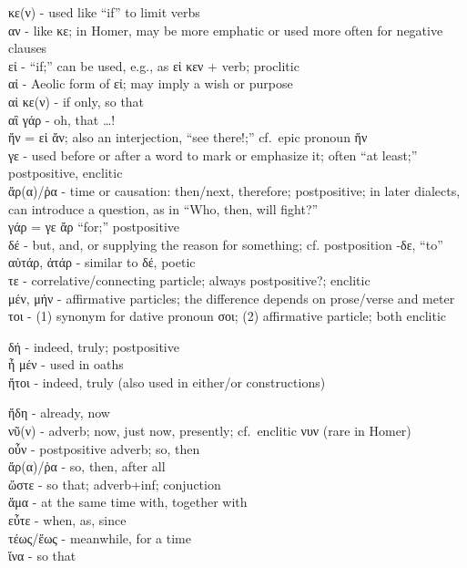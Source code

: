 \begin{small}
κε(ν) - used like ``if'' to limit verbs\\
αν - like κε; in Homer, may be more emphatic or used more often for negative clauses\\
εἰ - ``if;'' can be used, e.g., as εἰ κεν + verb; proclitic\\
αἰ - Aeolic form of εἰ; may imply a wish or purpose\\
αἰ κε(ν) - if only, so that\\
αἲ γάρ - oh, that \ldots !\\
ἤν = εἰ ἄν; also an interjection, ``see there!;'' cf.~epic pronoun ἥν\\
γε - used before or after a word to mark or emphasize it; often ``at least;'' postpositive, enclitic\\
ἄρ(α)/ῥα - time or causation: then/next, therefore; postpositive; in later dialects, can introduce
      a question, as in ``Who, then, will fight?''\\
γάρ = γε ἄρ ``for;'' postpositive\\
δέ - but, and, or supplying the reason for something; cf. postposition -δε, ``to''\\
αὐτάρ, ἀτάρ - similar to δέ, poetic\\
τε - correlative/connecting particle; always postpositive?; enclitic\\
μέν, μήν - affirmative particles; the difference depends on prose/verse and meter\\
τοι - (1) synonym for dative pronoun σοι; (2) affirmative particle; both enclitic\\


δή - indeed, truly; postpositive\\
ἦ μέν - used in oaths\\
ἤτοι - indeed, truly (also used in either/or constructions)\\


ἤδη - already, now\\
νῦ(ν) - adverb; now, just now, presently; cf.~enclitic νυν (rare in Homer)\\
οὖν - postpositive adverb; so, then\\
ἄρ(α)/ῥα - so, then, after all\\
ὥστε - so that; adverb+inf; conjuction\\
ἅμα - at the same time with, together with\\
εὖτε - when, as, since\\
τέως/ἕως - meanwhile, for a time\\
ἵνα - so that\\


\end{small}
